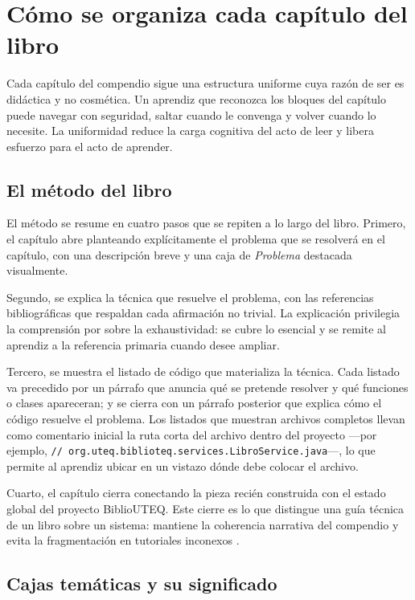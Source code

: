 \section{C\'omo se organiza cada cap\'itulo del libro}
\label{sec:u0:metodo}

Cada cap\'itulo del compendio sigue una estructura uniforme cuya raz\'on de ser es did\'actica y no cosm\'etica. Un aprendiz que reconozca los bloques del cap\'itulo puede navegar con seguridad, saltar cuando le convenga y volver cuando lo necesite. La uniformidad reduce la carga cognitiva del acto de leer y libera esfuerzo para el acto de aprender.

\subsection{El m\'etodo del libro}
\label{sec:u0:metodo:metodo}

El m\'etodo se resume en cuatro pasos que se repiten a lo largo del libro. Primero, el cap\'itulo abre planteando expl\'icitamente el problema que se resolver\'a en el cap\'itulo, con una descripci\'on breve y una caja de \textit{Problema} destacada visualmente.

Segundo, se explica la t\'ecnica que resuelve el problema, con las referencias bibliogr\'aficas que respaldan cada afirmaci\'on no trivial. La explicaci\'on privilegia la comprensi\'on por sobre la exhaustividad: se cubre lo esencial y se remite al aprendiz a la referencia primaria cuando desee ampliar.

Tercero, se muestra el listado de c\'odigo que materializa la t\'ecnica. Cada listado va precedido por un p\'arrafo que anuncia qu\'e se pretende resolver y qu\'e funciones o clases apareceran; y se cierra con un p\'arrafo posterior que explica c\'omo el c\'odigo resuelve el problema. Los listados que muestran archivos completos llevan como comentario inicial la ruta corta del archivo dentro del proyecto ---por ejemplo, \texttt{// org.uteq.biblioteq.services.LibroService.java}---, lo que permite al aprendiz ubicar en un vistazo d\'onde debe colocar el archivo.

Cuarto, el cap\'itulo cierra conectando la pieza reci\'en construida con el estado global del proyecto BiblioUTEQ. Este cierre es lo que distingue una gu\'ia t\'ecnica de un libro sobre un sistema: mantiene la coherencia narrativa del compendio y evita la fragmentaci\'on en tutoriales inconexos \cite{washizaki2024swebok}.

\subsection{Cajas tem\'aticas y su significado}
\label{sec:u0:metodo:cajas}

